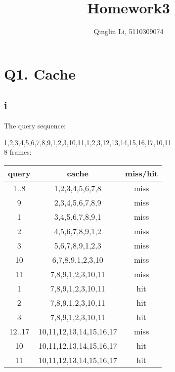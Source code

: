 \documentclass[12pt]{article}
\date{}
\title{Homework3}
\author{Qinglin Li, 5110309074}
\begin{document}
\maketitle
\section*{Q1. Cache}
	\subsection*{i}
	The query sequence:

	1,2,3,4,5,6,7,8,9,1,2,3,10,11,1,2,3,12,13,14,15,16,17,10,11\\

	8 frames:\\
	\begin{tabular}{|c|c|c|}
	\hline
	query & cache & miss/hit \\
	\hline

	1..8 & 1,2,3,4,5,6,7,8 & miss \\ \hline

	9 & 2,3,4,5,6,7,8,9 & miss \\ \hline

	1 & 3,4,5,6,7,8,9,1 & miss \\ \hline

	2 & 4,5,6,7,8,9,1,2 & miss \\ \hline

	3 & 5,6,7,8,9,1,2,3 & miss \\ \hline

	10 & 6,7,8,9,1,2,3,10 & miss \\ \hline

	11 & 7,8,9,1,2,3,10,11 & miss \\ \hline

	1 & 7,8,9,1,2,3,10,11 & hit \\ \hline

	2 & 7,8,9,1,2,3,10,11 & hit \\ \hline

	3 & 7,8,9,1,2,3,10,11 & hit \\ \hline

	12..17 & 10,11,12,13,14,15,16,17 & miss \\ \hline

	10 & 10,11,12,13,14,15,16,17 & hit \\ \hline

	11 & 10,11,12,13,14,15,16,17 & hit \\ \hline

	\end{tabular}
\end{document}
